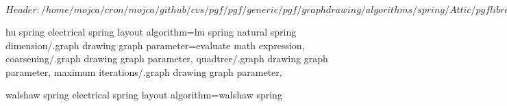%
%
%

\ProvidesFileRCS[v\pgfversion] $Header: /home/mojca/cron/mojca/github/cvs/pgf/pgf/generic/pgf/graphdrawing/algorithms/spring/Attic/pgflibrarygraphdrawing.spring.code.tex,v 1.1 2011/05/06 15:12:16 jannis-pohlmann Exp $







%
%



%
% 
%
\pgfgddeclarealgorithmkey
  {hu spring electrical}
  {spring layout}
  {algorithm=hu spring}
  {
    natural spring dimension/.graph drawing graph parameter=evaluate math expression,
    coarsening/.graph drawing graph parameter,
    quadtree/.graph drawing graph parameter,
    maximum iterations/.graph drawing graph parameter,
  }



%
%
%
\pgfgddeclarealgorithmkey
  {walshaw spring electrical}
  {spring layout}
  {algorithm=walshaw spring}
  {}

